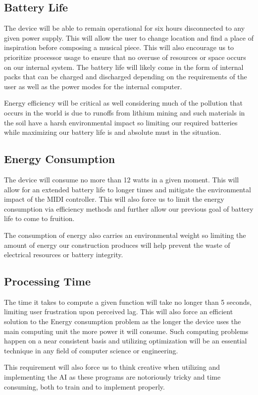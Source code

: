 \subsection{Battery Life}

The device will be able to remain operational for six hours disconnected to any given
power supply. This will allow the user to change location and find a place of inspiration
before composing a musical piece. This will also encourage us to prioritize processor
usage to ensure that no overuse of resources or space occurs on our internal system. The
battery life will likely come in the form of internal packs that can be charged and
discharged depending on the requirements of the user as well as the power modes for the
internal computer.

Energy efficiency will be critical as well considering much of the pollution that occurs
in the world is due to runoffs from lithium mining and such materials in the soil have a
harsh environmental impact so limiting our required batteries while maximizing our battery
life is and absolute must in the situation.

\subsection{Energy Consumption}

The device will consume no more than 12 watts in a given moment. This will allow for an
extended battery life to longer times and mitigate the environmental impact of the MIDI
controller. This will also force us to limit the energy consumption via efficiency methods
and further allow our previous goal of battery life to come to fruition.

The consumption of energy also carries an environmental weight so limiting the amount of
energy our construction produces will help prevent the waste of electrical resources or
battery integrity.

\subsection{Processing Time}

The time it takes to compute a given function will take no longer than 5 seconds, limiting
user frustration upon perceived lag. This will also force an efficient solution to the
Energy consumption problem as the longer the device uses the main computing unit the more
power it will consume. Such computing problems happen on a near consistent basis and
utilizing optimization will be an essential technique in any field of computer science or
engineering.

This requirement will also force us to think creative when utilizing and implementing the
AI as these programs are notoriously tricky and time consuming, both to train and to
implement properly.
